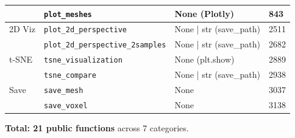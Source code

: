 \documentclass[12pt,a4paper]{article}
\begin{document}
\begin{table}[H]
{\begin{tabular}{llP{4.5cm}l}
       & \texttt{plot\_meshes} & None (Plotly) & 843 \\
\midrule
2D Viz & \texttt{plot\_2d\_perspective} & None | str (save\_path) & 2511 \\
       & \texttt{plot\_2d\_perspective\_2samples} & None | str (save\_path) & 2682 \\
\midrule
t-SNE & \texttt{tsne\_visualization} & None (plt.show) & 2889 \\
      & \texttt{tsne\_compare} & None | str (save\_path) & 2938 \\
\midrule
Save & \texttt{save\_mesh} & None & 3037 \\
     & \texttt{save\_voxel} & None & 3138 \\
\bottomrule
\end{tabular}%
}
\normalsize
\end{table}

\textbf{Total: 21 public functions} across 7 categories.
\end{document}
